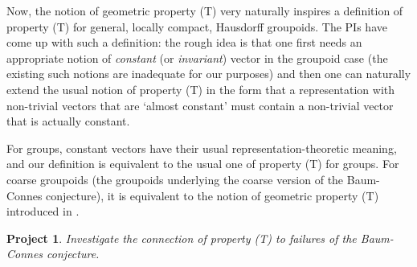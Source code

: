 \documentclass[11pt]{article}
\theoremstyle{plain}
\newtheorem{project}[theorem]{Project}
\theoremstyle{definition}
\newtheorem{definition}[theorem]{Definition}
\theoremstyle{remark}
\begin{document}
Now, the notion of geometric property (T) very naturally inspires a definition of property (T) for general, locally compact, Hausdorff groupoids.   The PIs have come up with such a definition: the rough idea is that one first needs an appropriate notion of \emph{constant} (or \emph{invariant}) vector in the groupoid case (the existing such notions are inadequate for our purposes) and then one can naturally extend the usual notion of property (T) in the form that a representation with non-trivial vectors that are `almost constant' must contain a non-trivial vector that is actually constant.

For groups, constant vectors have their usual representation-theoretic meaning, and our definition is equivalent to the usual one of property (T) for groups.  For coarse groupoids (the groupoids underlying the coarse version of the Baum-Connes conjecture), it is equivalent to the notion of geometric property (T) introduced in \cite{Willett:2013cr}.   




\begin{project}
Investigate the connection of property (T) to failures of the Baum-Connes conjecture.
\end{project}
\end{document}
